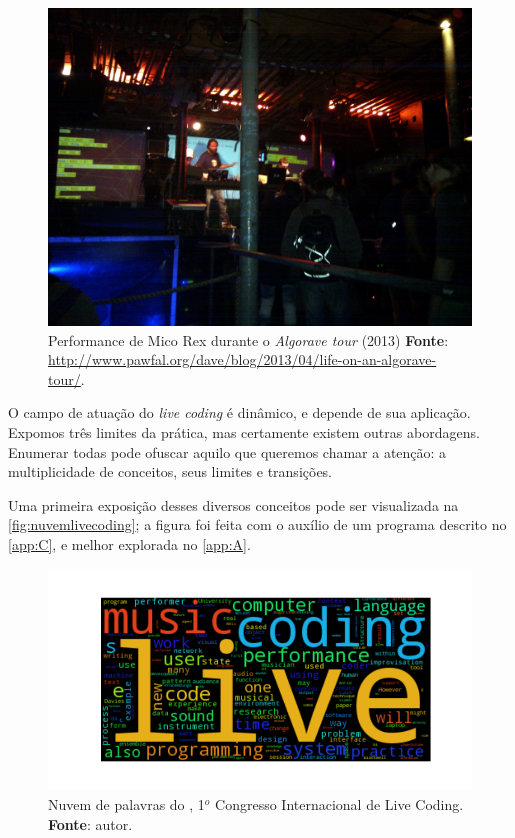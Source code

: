 \begin{figure}[!h]
  \centering
  \includegraphics[scale=0.3]{imagens/algorave.jpg}
  \caption{Performance de Mico Rex durante o \emph{Algorave tour} (2013) \textbf{Fonte}: \url{http://www.pawfal.org/dave/blog/2013/04/life-on-an-algorave-tour/}.}
  \label{fig:algorave}
\end{figure}

O campo de atuação do \emph{live coding} é dinâmico, e depende de sua aplicação. Expomos três limites da prática, mas certamente existem outras abordagens. Enumerar todas pode ofuscar aquilo que queremos chamar a atenção: a multiplicidade de conceitos, seus limites e transições.

Uma primeira exposição desses diversos conceitos pode ser visualizada na \autoref{fig:nuvemlivecoding}; a figura foi feita com o auxílio de um programa descrito no \autoref{app:C}, e melhor explorada no \autoref{app:A}. 

\begin{figure}[!h]
\begin{center}
\centering
\includegraphics[scale=0.8]{./imagens/livecoding_cloud1.png}
\caption{Nuvem de palavras do ,  1$^o$ Congresso Internacional de Live Coding. \textbf{Fonte}: autor.}
\label{fig:nuvemlivecoding}
\end{center}
\end{figure}


